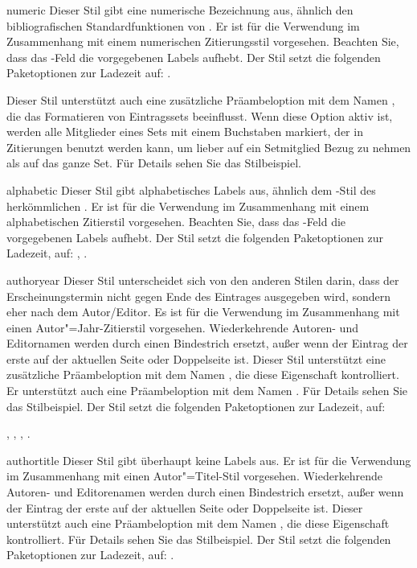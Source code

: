 \documentclass{ltxdockit}[2011/03/25]
\begin{document}
\begin{marglist}

\item[numeric] Dieser Stil gibt eine numerische Bezeichnung aus, ähnlich
den bibliografischen Standardfunktionen von \latex. Er ist für die Verwendung
im Zusammenhang mit einem numerischen Zitierungsstil vorgesehen. Beachten
Sie, dass
das -Feld die vorgegebenen Labels aufhebt. Der Stil setzt
die folgenden Paketoptionen zur Ladezeit auf: .

Dieser Stil unterstützt auch eine zusätzliche Präambeloption mit dem Namen
, die das Formatieren von Eintragssets beeinflusst. Wenn
diese Option aktiv ist, werden alle Mitglieder eines Sets mit einem Buchstaben
markiert, der in Zitierungen  benutzt werden kann, um lieber auf ein Setmitglied
Bezug zu nehmen als auf das ganze Set. Für Details sehen Sie das Stilbeispiel. 

\item[alphabetic] Dieser Stil gibt alphabetisches Labels aus, ähnlich dem
-Stil des herkömmlichen \bibtex. Er ist für die Verwendung
im Zusammenhang mit einem alphabetischen Zitierstil vorgesehen.
Beachten Sie, dass
das -Feld die vorgegebenen Labels aufhebt. Der Stil setzt die
folgenden Paketoptionen zur Ladezeit, auf: ,
.  

\item[authoryear] Dieser Stil unterscheidet sich von den anderen Stilen darin,
dass der Erscheinungstermin nicht gegen Ende des Eintrages ausgegeben wird,
sondern eher nach dem Autor\slash Editor. Es ist für die Verwendung im
Zusammenhang mit einen Autor"=Jahr-Zitierstil vorgesehen. Wiederkehrende
Autoren- und Editornamen werden durch einen Bindestrich ersetzt, außer wenn der
Eintrag der erste auf der aktuellen Seite oder Doppelseite ist. Dieser Stil
unterstützt eine zusätzliche Präambeloption mit dem Namen , die
diese Eigenschaft kontrolliert. Er unterstützt auch eine Präambeloption mit
dem Namen . Für Details sehen Sie das Stilbeispiel. Der Stil setzt die
folgenden Paketoptionen zur Ladezeit, auf: 

, , , .

\item[authortitle] Dieser Stil gibt überhaupt keine Labels aus. Er ist für die
Verwendung im Zusammenhang mit einen Autor"=Titel-Stil vorgesehen.
Wiederkehrende Autoren- und Editorenamen werden durch einen Bindestrich ersetzt,
außer wenn der Eintrag der erste auf der aktuellen Seite oder Doppelseite ist.
Dieser unterstützt auch eine Präambeloption mit dem Namen , die
diese Eigenschaft kontrolliert. Für Details sehen Sie das Stilbeispiel. Der Stil
setzt die folgenden Paketoptionen zur Ladezeit, auf: .


\end{marglist}
\end{document}
